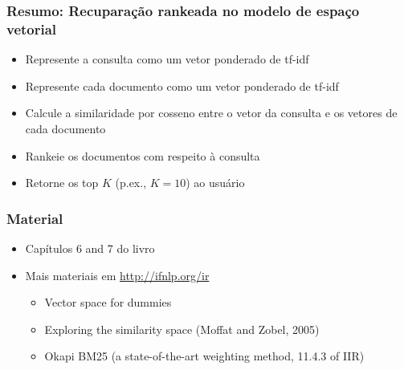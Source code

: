 \documentclass[compress]{beamer}
\begin{document}
\begin{frame}[<+->]
\frametitle{Resumo: Recuparação rankeada no modelo de espaço vetorial}
\pause[2]
\begin{itemize}
\item Represente a consulta como um vetor ponderado de tf-idf 
\item Represente cada documento como um vetor ponderado de tf-idf
\item Calcule a similaridade por cosseno entre o vetor da consulta e os vetores de cada documento
\item Rankeie os documentos com respeito à consulta
\item Retorne os top $K$ (p.ex., $K=10$) ao usuário
\end{itemize}
\end{frame}


\begin{frame}
\frametitle{Material}
\begin{itemize}
\item Capítulos 6 and 7 do livro
\item Mais materiais em \url{http://ifnlp.org/ir}
\begin{itemize}
\item Vector space for dummies
\item
Exploring the similarity space (Moffat and Zobel, 2005)
\item Okapi BM25 (a state-of-the-art weighting method, 11.4.3 of IIR)
\end{itemize}
\end{itemize}
\end{frame}
\end{document}
